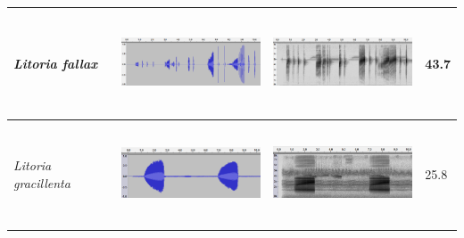 \begin{table}[htb!]
\begin{tabular}{llll}
\textit{Litoria fallax}      &      \begin{minipage}{.3\textwidth} \includegraphics[width=45mm, height=30mm]{image/Ch1/fallax_wav.png} \end{minipage}   &   \begin{minipage}{.3\textwidth} \includegraphics[width=45mm, height=30mm]{image/Ch1/fallax_spec.png}   \end{minipage}       & 43.7  \\ \hline
\textit{Litoria gracillenta} &     \begin{minipage}{.3\textwidth} \includegraphics[width=45mm, height=30mm]{image/Ch1/graci_wav.png}  \end{minipage}   &    \begin{minipage}{.3\textwidth} \includegraphics[width=45mm, height=30mm]{image/Ch1/graci_spec.png}     \end{minipage}    & 25.8  \\ \hline

\end{tabular}
\end{table}
